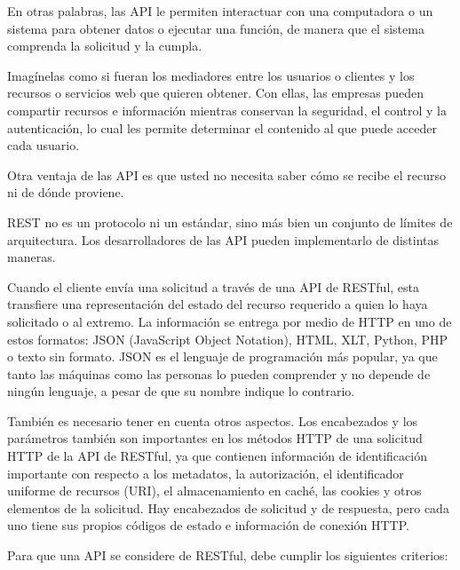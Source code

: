 En otras palabras, las API le permiten interactuar con una computadora o un sistema para obtener datos o ejecutar una función, de manera que el sistema comprenda la solicitud y la cumpla. 

Imagínelas como si fueran los mediadores entre los usuarios o clientes y los recursos o servicios web que quieren obtener. Con ellas, las empresas pueden compartir recursos e información mientras conservan la seguridad, el control y la autenticación, lo cual les permite determinar el contenido al que puede acceder cada usuario. 

Otra ventaja de las API es que usted no necesita saber cómo se recibe el recurso ni de dónde proviene.

REST no es un protocolo ni un estándar, sino más bien un conjunto de límites de arquitectura. Los desarrolladores de las API pueden implementarlo de distintas maneras.

Cuando el cliente envía una solicitud a través de una API de RESTful, esta transfiere una representación del estado del recurso requerido a quien lo haya solicitado o al extremo. La información se entrega por medio de HTTP en uno de estos formatos: JSON (JavaScript Object Notation), HTML, XLT, Python, PHP o texto sin formato. JSON es el lenguaje de programación más popular, ya que tanto las máquinas como las personas lo pueden comprender y no depende de ningún lenguaje, a pesar de que su nombre indique lo contrario. 

También es necesario tener en cuenta otros aspectos. Los encabezados y los parámetros también son importantes en los métodos HTTP de una solicitud HTTP de la API de RESTful, ya que contienen información de identificación importante con respecto a los metadatos, la autorización, el identificador uniforme de recursos (URI), el almacenamiento en caché, las cookies y otros elementos de la solicitud. Hay encabezados de solicitud y de respuesta, pero cada uno tiene sus propios códigos de estado e información de conexión HTTP.

Para que una API se considere de RESTful, debe cumplir los siguientes criterios:

